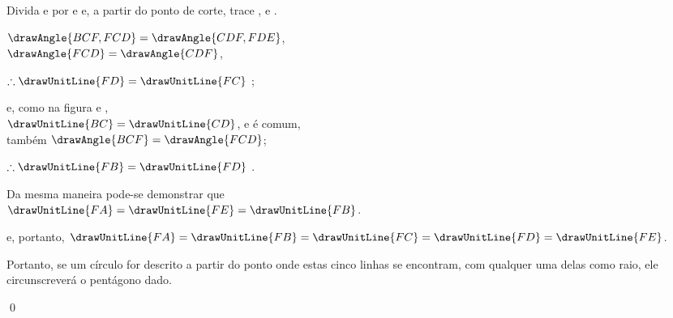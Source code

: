 \documentclass[booklanguage=brazilian]{byrnebook}
\begin{document}
\begin{center}
Divida  e  por  e  e, a partir do ponto de corte, trace ,  e .

$\drawAngle{BCF,FCD} = \drawAngle{CDF,FDE}$,\\
$\drawAngle{FCD} = \drawAngle{CDF}$,

$\therefore \drawUnitLine{FD} = \drawUnitLine{FC}$ ;

e, como na figura
e
,\\
$\drawUnitLine{BC} = \drawUnitLine{CD}$, e  é comum,\\
também $\drawAngle{BCF} = \drawAngle{FCD}$;

$\therefore \drawUnitLine{FB} = \drawUnitLine{FD}$ .

Da mesma maneira pode-se demonstrar que\\
$\drawUnitLine{FA} = \drawUnitLine{FE} = \drawUnitLine{FB}$.

e, portanto, $\drawUnitLine{FA} = \drawUnitLine{FB} = \drawUnitLine{FC} = \drawUnitLine{FD} = \drawUnitLine{FE}$.
\end{center}

Portanto, se um círculo for descrito a partir do ponto onde estas cinco linhas se encontram, com qualquer uma delas como raio, ele circunscreverá o pentágono dado.

\qed
\end{document}
